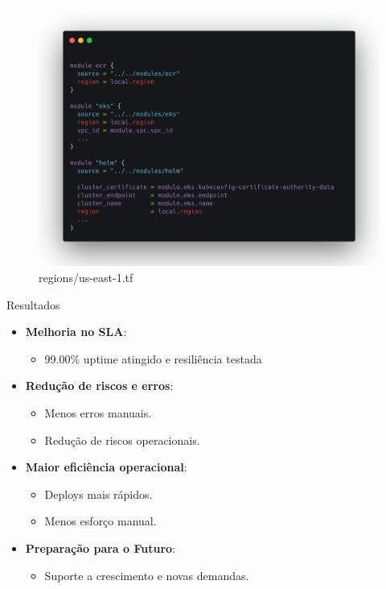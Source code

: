 \documentclass[aspectratio=169]{beamer}
\begin{document}
\begin{frame}
	
	
	\begin{figure}
		\centering
		\includegraphics[width=0.7\linewidth]{Images/modulos}
		\caption{regions/us-east-1.tf}
	\end{figure}
	
\end{frame}


\begin{frame}{Resultados}
	\begin{itemize}
		\item \textbf{Melhoria no SLA}:
		\begin{itemize}
			\item 99.00\% uptime atingido e resiliência testada
		\end{itemize}
		\item \textbf{Redução de riscos e erros}:
		\begin{itemize}
			\item Menos erros manuais.
			\item Redução de riscos operacionais.
		\end{itemize}
		\item \textbf{Maior eficiência operacional}:
		\begin{itemize}
			\item Deploys mais rápidos.
			\item Menos esforço manual.
		\end{itemize}
		\item \textbf{Preparação para o Futuro}:
		\begin{itemize}
			\item Suporte a crescimento e novas demandas.
		\end{itemize}
	\end{itemize}
\end{frame}
\end{document}
